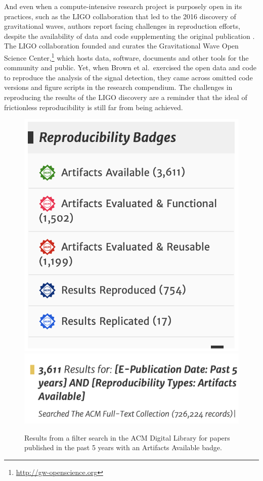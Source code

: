 \documentclass[]{hdsr}
\begin{document}
And even when a compute-intensive research project is purposely open in its practices, such as the LIGO collaboration that led to the 2016 discovery of gravitational waves, authors report facing challenges in reproduction efforts, despite the availability of data and code supplementing the original publication \citep{brown2021reproducing}. The LIGO collaboration founded and curates the Gravitational Wave Open Science Center,\footnote{\url{http://gw-openscience.org}} which hosts data, software, documents and other tools for the community and public. Yet, when Brown et al.\ exercised the open data and code to reproduce the analysis of the signal detection, they came across omitted code versions and figure scripts in the research compendium. The challenges in reproducing the results of the LIGO discovery are a reminder that the ideal of frictionless reproducibility is still far from being achieved.

\begin{figure}
    \centering
    \includegraphics[scale=0.4]{acm_badges_5years-a} \\
    \includegraphics[scale=0.45]{acm_badges_5years-b} \\
    \caption{Results from a filter search in the ACM Digital Library for papers published in the past 5 years with an Artifacts Available badge.}
    \label{fig:acm_badges_5years}
\end{figure}
\end{document}
